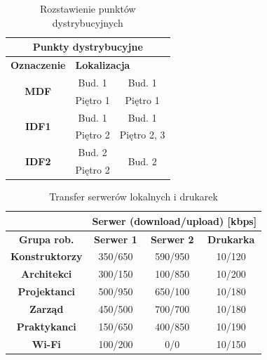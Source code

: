 \documentclass[a4paper, 12pt]{article}
\begin{document}
\begin{table}[H]
	\centering
	\begin{tabular}{|c|c|c|}
	\hline
	\multicolumn{3}{|c|}{\textbf{Punkty dystrybucyjne}}                 \\ \hline
	\textbf{Oznaczenie}            & \multicolumn{2}{l|}{\textbf{Lokalizacja}}   \\ \hline
	\multirow{2}{*}{\textbf{MDF}}  & Bud. 1   & Bud. 1                  \\
	                      & Piętro 1 & Piętro 1                \\ \hline
	\multirow{2}{*}{\textbf{IDF1}} & Bud. 1   & Bud. 1                  \\
	                      & Piętro 2 & Piętro 2, 3             \\ \hline
	\multirow{2}{*}{\textbf{IDF2}} & Bud. 2   & \multirow{2}{*}{Bud. 2} \\
	                      & Piętro 2 &                         \\ \hline
	\end{tabular}
	\caption{Rozstawienie punktów dystrybucyjnych}
\end{table}

\begin{table}[H]
	\centering
	\begin{tabular}{l|c|c|c|}
	\cline{2-4}
	                                    & \multicolumn{3}{c|}{\textbf{Serwer (download/upload) {[}kbps{]}}} \\ \hline
	\multicolumn{1}{|c|}{\textbf{Grupa rob.}}    & \textbf{Serwer 1}       & \textbf{Serwer 2}        & \textbf{Drukarka}       \\ \hline
	\multicolumn{1}{|c|}{\textbf{Konstruktorzy}} & 350/650           & 590/950           & 10/120           \\ \hline
	\multicolumn{1}{|c|}{\textbf{Architekci} }   & 300/150           & 100/850           & 10/200           \\ \hline
	\multicolumn{1}{|c|}{\textbf{Projektanci}}   & 500/950           & 650/100           & 10/180           \\ \hline
	\multicolumn{1}{|c|}{\textbf{Zarząd} }       & 450/500           & 700/700           & 10/180           \\ \hline
	\multicolumn{1}{|c|}{\textbf{Praktykanci}}   & 150/650           & 400/850           & 10/190           \\ \hline
	\multicolumn{1}{|c|}{\textbf{Wi-Fi}}         & 100/200           & 0/0               & 10/150           \\ \hline
	\end{tabular}
	\caption{Transfer serwerów lokalnych i drukarek}
\end{table}
\end{document}
